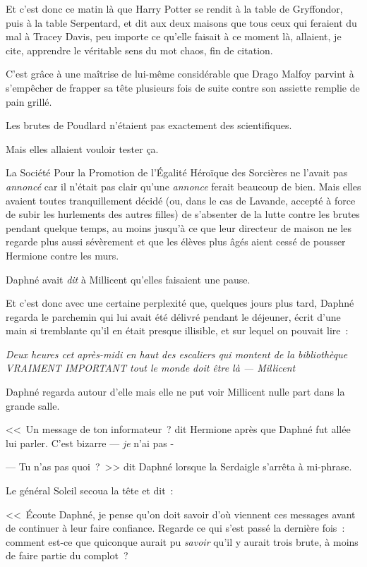 \later

Et c'est donc ce matin là que Harry Potter se rendit à la table de Gryffondor, puis à la table Serpentard, et dit aux deux maisons que tous ceux qui feraient du mal à Tracey Davis, peu importe ce qu'elle faisait à ce moment là, allaient, je cite, apprendre le véritable sens du mot chaos, fin de citation.

C'est grâce à une maîtrise de lui-même considérable que Drago Malfoy parvint à s'empêcher de frapper sa tête plusieurs fois de suite contre son assiette remplie de pain grillé.

Les brutes de Poudlard n'étaient pas exactement des scientifiques.

Mais elles allaient vouloir tester ça.

\later

La Société Pour la Promotion de l'Égalité Héroïque des Sorcières ne l'avait pas \emph{annoncé} car il n'était pas clair qu'une \emph{annonce} ferait beaucoup de bien. Mais elles avaient toutes tranquillement décidé (ou, dans le cas de Lavande, accepté à force de subir les hurlements des autres filles) de s'absenter de la lutte contre les brutes pendant quelque temps, au moins jusqu'à ce que leur directeur de maison ne les regarde plus aussi sévèrement et que les élèves plus âgés aient cessé de pousser Hermione contre les murs.

Daphné avait \emph{dit} à Millicent qu'elles faisaient une pause.

Et c'est donc avec une certaine perplexité que, quelques jours plus tard, Daphné regarda le parchemin qui lui avait été délivré pendant le déjeuner, écrit d'une main si tremblante qu'il en était presque illisible, et sur lequel on pouvait lire~:

\emph{Deux heures cet après-midi en haut des escaliers qui montent de la bibliothèque VRAIMENT IMPORTANT tout le monde doit être là — Millicent}

Daphné regarda autour d'elle mais elle ne put voir Millicent nulle part dans la grande salle.

<<~Un message de ton informateur~? dit Hermione après que Daphné fut allée lui parler. C'est bizarre — \emph{je} n'ai pas -

--- Tu n'as pas quoi~?~>> dit Daphné lorsque la Serdaigle s'arrêta à mi-phrase.

Le général Soleil secoua la tête et dit~:

<<~Écoute Daphné, je pense qu'on doit savoir d'où viennent ces messages avant de continuer à leur faire confiance. Regarde ce qui s'est passé la dernière fois~: comment est-ce que quiconque aurait pu \emph{savoir} qu'il y aurait trois brute, à moins de faire partie du complot~?

